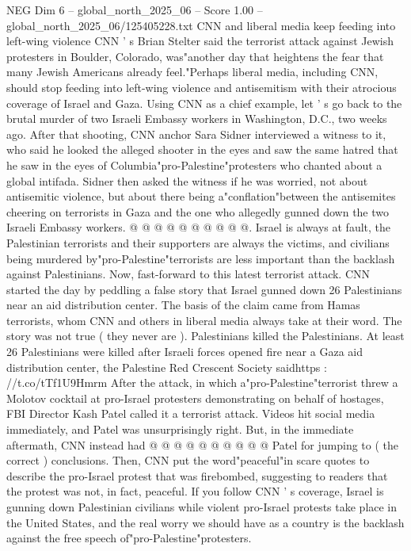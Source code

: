 \begin{textsample}{NEG Dim 6 – global\_north\_2025\_06 – Score 1.00 – global\_north\_2025\_06/125405228.txt}  \label{ex:f6_neg_423}
CNN and liberal media keep feeding into left-wing violence CNN ' s Brian Stelter said the terrorist attack against Jewish protesters in Boulder, Colorado, was"another day that heightens the fear that many Jewish Americans already feel."Perhaps liberal media, including CNN, should stop feeding into left-wing violence and antisemitism with their atrocious coverage of Israel and Gaza.
Using CNN as a chief example, let ' s go back to the brutal murder of two Israeli Embassy workers in Washington, D.C., two weeks ago.
After that shooting, CNN anchor Sara Sidner interviewed a witness to it, who said he looked the alleged shooter in the eyes and saw the same hatred that he saw in the eyes of Columbia"pro-Palestine"protesters who chanted about a global intifada.
Sidner then asked the witness if he was worried, not about antisemitic violence, but about there being a"conflation"between the antisemites cheering on terrorists in Gaza and the one who allegedly gunned down the two Israeli Embassy workers. @ @ @ @ @ @ @ @ @ @.
Israel is always at fault, the Palestinian terrorists and their supporters are always the victims, and civilians being murdered by"pro-Palestine"terrorists are less important than the backlash against Palestinians.
Now, fast-forward to this latest terrorist attack.
CNN started the day by peddling a false story that Israel gunned down 26 Palestinians near an aid distribution center.
The basis of the claim came from Hamas terrorists, whom CNN and others in liberal media always take at their word.
The story was not true ( they never are ).
Palestinians killed the Palestinians.
At least 26 Palestinians were killed after Israeli forces opened fire near a Gaza aid distribution center, the Palestine Red Crescent Society saidhttps : //t.co/tTf1U9Hmrm After the attack, in which a"pro-Palestine"terrorist threw a Molotov cocktail at pro-Israel protesters demonstrating on behalf of hostages, FBI Director Kash Patel called it a terrorist attack.
Videos hit social media immediately, and Patel was unsurprisingly right.
But, in the immediate aftermath, CNN instead had @ @ @ @ @ @ @ @ @ @ Patel for jumping to ( the correct ) conclusions.
Then, CNN put the word"peaceful"in scare quotes to describe the pro-Israel protest that was firebombed, suggesting to readers that the protest was not, in fact, peaceful.
If you follow CNN ' s coverage, Israel is gunning down Palestinian civilians while violent pro-Israel protests take place in the United States, and the real worry we should have as a country is the backlash against the free speech of"pro-Palestine"protesters.

\end{textsample}

